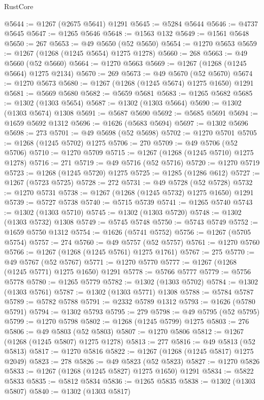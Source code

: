 \begin{lexlean}{RustCore}
\begin{coremodule}
@5644 := @1267 (@2675 @5641) @1291
@5645 := @5284 @5644
@5646 := @4737 @5645
@5647 := @1265 @5646
@5648 := @1563 @132
@5649 := @1561 @5648
@5650 := 267
@5653 := @49 @5650 (@52 @5650)
@5654 := @1270 @5653
@5659 := @1267 (@1268 (@1245 @5654) @1275 @1278)
@5660 := 268
@5663 := @49 @5660 (@52 @5660)
@5664 := @1270 @5663
@5669 := @1267 (@1268 (@1245 @5664) @1275 @2134)
@5670 := 269
@5673 := @49 @5670 (@52 @5670)
@5674 := @1270 @5673
@5680 := @1267 (@1268 (@1245 @5674) @1275 @1650) @1291
@5681 := @5669 @5680
@5682 := @5659 @5681
@5683 := @1265 @5682
@5685 := @1302 (@1303 @5654)
@5687 := @1302 (@1303 @5664)
@5690 := @1302 (@1303 @5674) @1308
@5691 := @5687 @5690
@5692 := @5685 @5691
@5694 := @1659 @5692 @1312
@5696 := @1626 (@5683 @5694)
@5697 := @1302 @5696
@5698 := 273
@5701 := @49 @5698 (@52 @5698)
@5702 := @1270 @5701
@5705 := @1268 (@1245 @5702) @1275
@5706 := 270
@5709 := @49 @5706 (@52 @5706)
@5710 := @1270 @5709
@5715 := @1267 (@1268 (@1245 @5710) @1275 @1278)
@5716 := 271
@5719 := @49 @5716 (@52 @5716)
@5720 := @1270 @5719
@5723 := @1268 (@1245 @5720) @1275
@5725 := @1285 (@1286 @612)
@5727 := @1267 (@5723 @5725)
@5728 := 272
@5731 := @49 @5728 (@52 @5728)
@5732 := @1270 @5731
@5738 := @1267 (@1268 (@1245 @5732) @1275 @1650) @1291
@5739 := @5727 @5738
@5740 := @5715 @5739
@5741 := @1265 @5740
@5743 := @1302 (@1303 @5710)
@5745 := @1302 (@1303 @5720)
@5748 := @1302 (@1303 @5732) @1308
@5749 := @5745 @5748
@5750 := @5743 @5749
@5752 := @1659 @5750 @1312
@5754 := @1626 (@5741 @5752)
@5756 := @1267 (@5705 @5754)
@5757 := 274
@5760 := @49 @5757 (@52 @5757)
@5761 := @1270 @5760
@5766 := @1267 (@1268 (@1245 @5761) @1275 @1761)
@5767 := 275
@5770 := @49 @5767 (@52 @5767)
@5771 := @1270 @5770
@5777 := @1267 (@1268 (@1245 @5771) @1275 @1650) @1291
@5778 := @5766 @5777
@5779 := @5756 @5778
@5780 := @1265 @5779
@5782 := @1302 (@1303 @5702)
@5784 := @1302 (@1303 @5761)
@5787 := @1302 (@1303 @5771) @1308
@5788 := @5784 @5787
@5789 := @5782 @5788
@5791 := @2332 @5789 @1312
@5793 := @1626 (@5780 @5791)
@5794 := @1302 @5793
@5795 := 279
@5798 := @49 @5795 (@52 @5795)
@5799 := @1270 @5798
@5802 := @1268 (@1245 @5799) @1275
@5803 := 276
@5806 := @49 @5803 (@52 @5803)
@5807 := @1270 @5806
@5812 := @1267 (@1268 (@1245 @5807) @1275 @1278)
@5813 := 277
@5816 := @49 @5813 (@52 @5813)
@5817 := @1270 @5816
@5822 := @1267 (@1268 (@1245 @5817) @1275 @2049)
@5823 := 278
@5826 := @49 @5823 (@52 @5823)
@5827 := @1270 @5826
@5833 := @1267 (@1268 (@1245 @5827) @1275 @1650) @1291
@5834 := @5822 @5833
@5835 := @5812 @5834
@5836 := @1265 @5835
@5838 := @1302 (@1303 @5807)
@5840 := @1302 (@1303 @5817)

\end{coremodule}
\end{lexlean}
